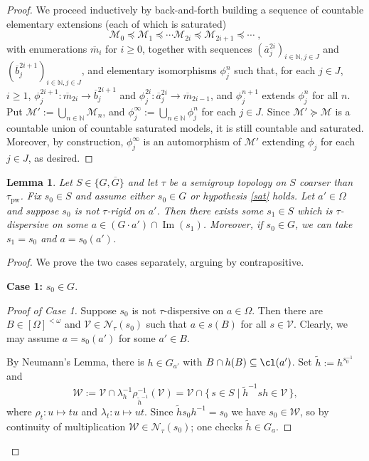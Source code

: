 \documentclass{article}
\newtheorem{lemma}[theorem]{Lemma}
\theoremstyle{remark}
\theoremstyle{definition}
\newcommand{\M}[0]{\mathcal{M}}
\newcommand{\V}[0]{\mathcal{V}}
\newcommand{\W}[0]{\mathcal{W}}
\DeclareMathOperator{\im}{Im}
\newcommand{\pw}[0]{\tau_{\mathrm{pw}}}
\newcommand*{\greysquare}{\textcolor{gray}{\blacksquare}}
\newenvironment{subproof}[1][\proofname]{%
\renewcommand{\qedsymbol}{$\greysquare$}%
\begin{proof}[#1]%
	}{%
\end{proof}%
}
\renewcommand\geq{\geqslant}
\begin{document}
{{{{{\begin{proof}
We proceed inductively by back-and-forth building a sequence of countable elementary extensions (each of which is saturated)
\[\M_0\preceq \M_1\preceq \cdots \M_{2i}\preceq \M_{2i+1}\preceq\cdots\;,\]
with enumerations $\overline{m}_i$ for $i\geq 0$, together with sequences $(\overline{a}_j^{2i})_{i\in\mathbb{N}, j\in J}$ and $(\overline{b}_j^{2i+1})_{i\in\mathbb{N}, j\in J}$, and elementary isomorphisms %
$\phi^n_j$ such that, for each $j\in J$, {$i\geq1$}, $\phi_j^{2i+1}: \overline{m}_{2i}\to\overline{b}^{2i+1}_j$ and $\phi_j^{2i}:\overline{a}^{2i}_j\to \overline{m}_{2i-1}$, %
and $\phi_j^{n+1}$ extends
  $\phi_j^n$ for all $n$.
Put $\M':=\bigcup_{n\in\mathbb{N}}\M_n$, and  $\phi_j^{\infty}:=\bigcup_{n\in\mathbb{N}}\phi_j^n$ for each $j\in J$. Since $\M'\succeq\M$ is a countable union of countable saturated models, it is still countable and saturated. Moreover, by construction, $\phi_j^\infty$ is an automorphism of $\M'$ extending $\phi_j$ for each $j\in J$, as desired.
\end{proof}



 \begin{lemma}
    \label{l:moving out} 
    Let $S\in\{G, \overline{G}\}$ and let $\tau$ be a semigroup topology on $S$ coarser than $\pw$.  Fix $s_{0}\in S$ and assume either $s_{0}\in G$ or hypothesis \ref{sat} 
    holds.  Let $a'\in\Omega$ and suppose  $s_0$ is not $\tau$-rigid on $a'$. Then there exists some $s_{1}\in S$ which is $\tau$-dispersive  on some $a\in  (G\cdot a')\cap \im(s_{1})$. 
    Moreover, if $s_{0}\in G$, %
    we can take $s_{1}=s_{0}$ and $a=s_{0}(a')$.   
 \end{lemma}
 \begin{proof}


We prove the two cases separately, arguing by contrapositive.
 
   \textbf{Case 1:} $s_0 \in G$.
  \begin{subproof}[Proof of Case 1]
  Suppose $s_0$ is not $\tau$-dispersive on {$a\in\Omega$.}
  Then there are $B\in[\Omega]^{<\omega}$ and $\V\in\mathcal{N}_{\tau}(s_{0})$ such that $a\in s(B)$ for all $s\in\V$.
  Clearly, we may assume $a=s_0(a')$ for some $a'\in B$.   

   By Neumann's Lemma, there is $h \in G_{a'}$ with
  $B\cap h(B)\subseteq \cl(a')$. Set $\tilde{h} := h^{s_0^{-1}}$ and
  \[
    \W := \V \cap \lambda_h^{-1}\rho_{\tilde{h}^{-1}}^{-1}(\V)
        = \V \cap \{\, s \in S \mid \tilde{h}^{-1} s h \in \V \,\},
  \]
  where $\rho_t \colon u \mapsto tu$ and $\lambda_t \colon u \mapsto ut$. Since
  $\tilde{h} s_0 h^{-1} = s_0$ we have $s_0 \in \W$, so by continuity of multiplication
  $\W \in \mathcal{N}_\tau(s_0)$; one checks $\tilde{h} \in G_a$.


\end{subproof}
\end{proof}}}}}}
\end{document}
